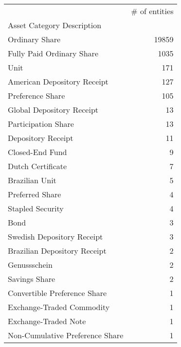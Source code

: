\begin{tabular}{lr}
\toprule
{} &  \# of entities \\
Asset Category Description      &                \\
\midrule
Ordinary Share                  &          19859 \\
Fully Paid Ordinary Share       &           1035 \\
Unit                            &            171 \\
American Depository Receipt     &            127 \\
Preference Share                &            105 \\
Global Depository Receipt       &             13 \\
Participation Share             &             13 \\
Depository Receipt              &             11 \\
Closed-End Fund                 &              9 \\
Dutch Certificate               &              7 \\
Brazilian Unit                  &              5 \\
Preferred Share                 &              4 \\
Stapled Security                &              4 \\
Bond                            &              3 \\
Swedish Depository Receipt      &              3 \\
Brazilian Depository Receipt    &              2 \\
Genussschein                    &              2 \\
Savings Share                   &              2 \\
Convertible Preference Share    &              1 \\
Exchange-Traded Commodity       &              1 \\
Exchange-Traded Note            &              1 \\
Non-Cumulative Preference Share &              1 \\
\bottomrule
\end{tabular}

